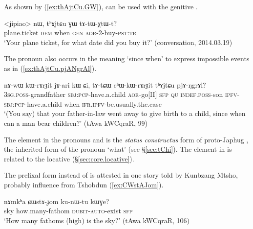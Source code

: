 As shown by (\ref{ex:thAjtCu.GW}),  can be used with the genitive .

\begin{exe}
\ex \label{ex:thAjtCu.GW}
\gll <jipiao> nɯ, tʰɤjtɕu ɣɯ tɤ-tɯ-χtɯ-t? \\
plane.ticket \textsc{dem} when \textsc{gen} \textsc{aor}-2-buy-\textsc{pst}:\textsc{tr} \\
\glt `Your plane ticket, for what date did you buy it?' (conversation, 2014.03.19)
\end{exe} 

 
The pronoun  also occurs in the meaning `since when' to express impossible events as in (\ref{ex:thAjtCu.pjANgrAl}).

\begin{exe}
\ex \label{ex:thAjtCu.pjANgrAl}
\gll  nɤ-wɯ kɯ-rɤrɟit jɤ-ari kɯ ɕi, tɤ-tɕɯ cʰɯ-kɯ-rɤrɟit tʰɤjtɕu pjɤ-ŋgrɤl? \\
\textsc{3sg}.\textsc{poss}-grandfather \textsc{sbj}:\textsc{pcp}-have.a.child \textsc{aor}-go[II] \textsc{sfp} \textsc{qu} \textsc{indef}.\textsc{poss}-son \textsc{ipfv}-\textsc{sbj}:\textsc{pcp}-have.a.child when \textsc{ifr}.\textsc{ipfv}-be.usually.the.case \\
\glt `(You say) that your father-in-law went away to give birth to a child, since when can a man bear children?' (tAwa kWCqraR, 99)
\end{exe} 

The element  in the pronouns   and  is the \textit{status constructus} form of proto-Japhug , the inherited form of the pronoun `what' (see §\ref{sec:tChi}). The element  in  is related to the locative  (§\ref{sec:core.locative}).

The prefixal form  instead of  is attested in one story told by Kunbzang Mtsho, probably influence from Tshobdun (\ref{ex:CWstAJom}).

\begin{exe}
\ex \label{ex:CWstAJom}
\gll nɤmkʰa ɕɯstɤ-ɟom ku-nɯ-tu kɯɣe?\\
sky how.many-fathom \textsc{dubit}-\textsc{auto}-exist \textsc{sfp} \\
\glt `How many fathoms (high) is the sky?' (tAwa kWCqraR, 106)
\end{exe}%

\subsection{} \label{sec:NotCu}

